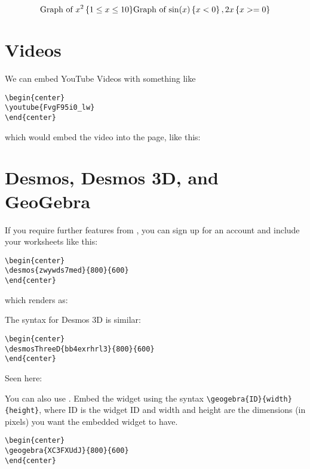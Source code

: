 \documentclass{ximera}
\begin{document}
\[
\text{Graph of $x^2 \left\{ 1 \leq x \leq 10 \right\}$}
\text{Graph of $ \sin(x)\left\{x<0\right\}, 2x\left\{ x>=0 \right\} $}  
\]
\section{Videos}

We can embed YouTube Videos with something like
\begin{example}
  \begin{verbatim}
\begin{center}
\youtube{FvgF95i0_lw}
\end{center}
\end{verbatim}
\end{example}

which would embed the video into the page, like this:
\begin{center}
\end{center}

\section{Desmos, Desmos 3D, and GeoGebra}

If you require further features from
, you can sign up for an account
and include your worksheets like this:
\begin{example}
  \begin{verbatim}
\begin{center}
\desmos{zwywds7med}{800}{600}
\end{center}
\end{verbatim}
\end{example}
which renders as:
\begin{center}
\end{center}

The syntax for Desmos 3D is similar:
\begin{example}
  \begin{verbatim}
\begin{center}
\desmosThreeD{bb4exrhrl3}{800}{600}
\end{center}
\end{verbatim}
\end{example}
Seen here:
\begin{center}
\end{center}

You can also use . Embed the
widget using the syntax \verb|\geogebra{ID}{width}{height}|, where ID
is the widget ID and width and height are the dimensions (in pixels)
you want the embedded widget to have.
\begin{example}
  \begin{verbatim}
\begin{center}
\geogebra{XC3FXUdJ}{800}{600}
\end{center}
\end{verbatim}
\end{example}
\begin{center}
\end{center}
\end{document}
